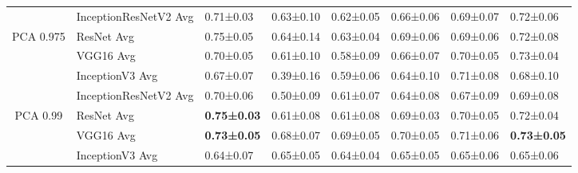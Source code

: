 \begin{landscape}
\begin{table}[]
\begin{tabular}{clllllll}
                            & InceptionResNetV2 Avg              & 0.71±0.03                                  & 0.63±0.10                         & 0.62±0.05                         & 0.66±0.06                         & 0.69±0.07                         & 0.72±0.06                         \\
\multirow{-4}{*}{PCA 0.975} & ResNet Avg                         & 0.75±0.05                                  & 0.64±0.14                         & 0.63±0.04                         & 0.69±0.06                         & 0.69±0.06                         & 0.72±0.08                         \\
                            & VGG16 Avg                          & 0.70±0.05                                  & 0.61±0.10                         & 0.58±0.09                         & 0.66±0.07                         & 0.70±0.05                         & 0.73±0.04                         \\
                            & InceptionV3 Avg                    & 0.67±0.07                                  & 0.39±0.16                         & 0.59±0.06                         & 0.64±0.10                         & 0.71±0.08                         & 0.68±0.10                         \\
                            & InceptionResNetV2 Avg              & 0.70±0.06                                  & 0.50±0.09                         & 0.61±0.07                         & 0.64±0.08                         & 0.67±0.09                         & 0.69±0.08                         \\
\multirow{-4}{*}{PCA 0.99}  & \cellcolor[HTML]{E7E6E6}ResNet Avg & \cellcolor[HTML]{E7E6E6}\textbf{0.75±0.03} & \cellcolor[HTML]{E7E6E6}0.61±0.08 & \cellcolor[HTML]{E7E6E6}0.61±0.08 & \cellcolor[HTML]{E7E6E6}0.69±0.03 & \cellcolor[HTML]{E7E6E6}0.70±0.05 & \cellcolor[HTML]{E7E6E6}0.72±0.04 \\
                            & VGG16 Avg                          & \textbf{0.73±0.05}                         & 0.68±0.07                         & 0.69±0.05                         & 0.70±0.05                         & 0.71±0.06                         & \textbf{0.73±0.05}                \\
                            & InceptionV3 Avg                    & 0.64±0.07                                  & 0.65±0.05                         & 0.64±0.04                         & 0.65±0.05                         & 0.65±0.06                         & 0.65±0.06                         \\

\end{tabular}
\end{table}
\end{landscape}
